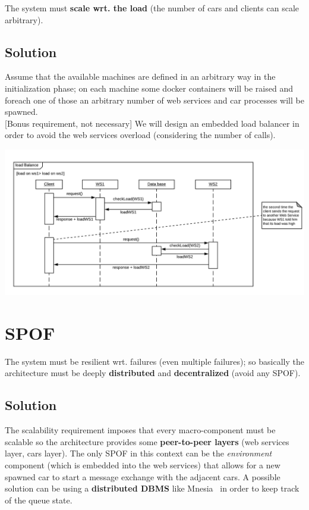 The system must \textbf{scale wrt. the load} 
(the number of cars and clients can scale arbitrary).


\subsection{Solution}

Assume that the available machines are defined in an arbitrary 
way in the initialization phase; on each machine some docker containers 
will be raised and foreach one of those an arbitrary number of web services and 
car processes will be spawned.\\


[Bonus requirement, not necessary]
We will design an embedded load balancer in order to avoid the web services overload 
(considering the number of calls).

\begin{center}
    \includegraphics[scale=0.6]{assets/ds2019_2.png}
\end{center}


\section{SPOF}

The system must be resilient wrt. failures (even multiple failures);
so basically the architecture must be deeply \textbf{distributed} 
and \textbf{decentralized} (avoid any SPOF). 


\subsection{Solution}

The scalability requirement imposes that every macro-component must be scalable 
so the architecture provides some \textbf{peer-to-peer layers} 
(web services layer, cars layer).
The only SPOF in this context can be the \textit{environment} component 
(which is embedded into the web services) that allows for a new spawned car to 
start a message exchange with the adjacent cars. 
A possible solution can be using a \textbf{distributed DBMS} like Mnesia~\cite{1} in order to keep 
track of the queue state.

